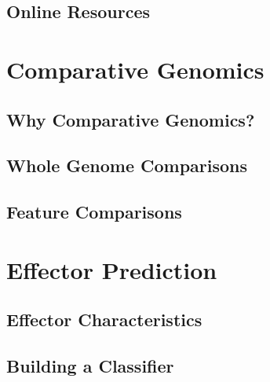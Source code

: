 \subsection{Online Resources}



\section{Comparative Genomics}

\subsection{Why Comparative Genomics?}


\subsection{Whole Genome Comparisons}


\subsection{Feature Comparisons}



\section{Effector Prediction}

\subsection{Effector Characteristics}


\subsection{Building a Classifier}


